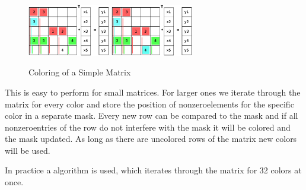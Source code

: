 \documentclass[a4paper,11pt]{scrartcl}
\begin{document}
\begin{figure}[ht]
\includegraphics[width=0.32\textwidth]{graphic/coloringT9.eps}\hfill\vline\hfill
\includegraphics[width=0.32\textwidth]{graphic/coloringT10.eps}
\caption{Coloring of a Simple Matrix}
\end{figure}

This is easy to perform for small matrices. For larger ones we iterate through 
the matrix for every color and store the position of nonzeroelements for the
specific color in a separate mask. Every new row can be compared to the
mask and if all nonzeroentries of the row do not interfere with the mask
it will be colored and the mask updated. As long as there are uncolored
rows of the matrix new colors will be used.

In practice a algorithm is used, which iterates through the matrix for 32 colors
at once. 
\end{document}
